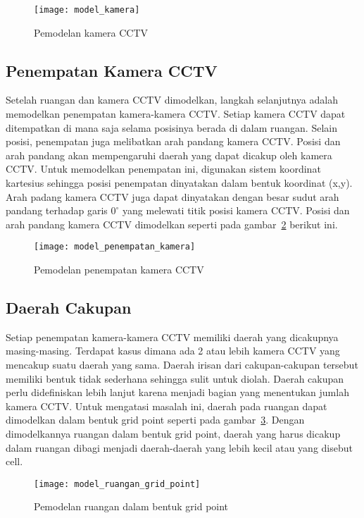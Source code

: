 \begin{figure}[H]
	\centering  
	\texttt{[image: model\_kamera]}
	\caption[Pemodelan kamera CCTV]{Pemodelan kamera CCTV} 
	\label{fig:model_kamera}
\end{figure}

\subsection{Penempatan Kamera CCTV}
Setelah ruangan dan kamera CCTV dimodelkan, langkah selanjutnya adalah memodelkan penempatan kamera-kamera CCTV. Setiap kamera CCTV dapat ditempatkan di mana saja selama posisinya berada di dalam ruangan. Selain posisi, penempatan juga melibatkan arah pandang kamera CCTV. Posisi dan arah pandang akan mempengaruhi daerah yang dapat dicakup oleh kamera CCTV. Untuk memodelkan penempatan ini, digunakan sistem koordinat kartesius sehingga posisi penempatan dinyatakan dalam bentuk koordinat (x,y). Arah padang kamera CCTV juga dapat dinyatakan dengan besar sudut arah pandang terhadap garis \(0^\circ\) yang melewati titik posisi kamera CCTV. Posisi dan arah pandang kamera CCTV dimodelkan seperti pada gambar~\ref{fig:model_penempatan_kamera} berikut ini.

\begin{figure}[H]
	\centering  
	\texttt{[image: model\_penempatan\_kamera]}
	\caption[Pemodelan penempatan kamera CCTV]{Pemodelan penempatan kamera CCTV} 
	\label{fig:model_penempatan_kamera}
\end{figure}

\subsection{Daerah Cakupan}
Setiap penempatan kamera-kamera CCTV memiliki daerah yang dicakupnya masing-masing. Terdapat kasus dimana ada 2 atau lebih kamera CCTV yang mencakup suatu daerah yang sama. Daerah irisan dari cakupan-cakupan tersebut memiliki bentuk tidak sederhana sehingga sulit untuk diolah. Daerah cakupan perlu didefiniskan lebih lanjut karena menjadi bagian yang menentukan jumlah kamera CCTV. Untuk mengatasi masalah ini, daerah pada ruangan dapat dimodelkan dalam bentuk grid point seperti pada gambar~\ref{fig:model_ruangan_grid_point}. Dengan dimodelkannya ruangan dalam bentuk grid point, daerah yang harus dicakup dalam ruangan dibagi menjadi daerah-daerah yang lebih kecil atau yang disebut cell.

\begin{figure}[H]
	\centering  
	\texttt{[image: model\_ruangan\_grid\_point]}
	\caption[Pemodelan ruangan dalam bentuk grid point]{Pemodelan ruangan dalam bentuk grid point} 
	\label{fig:model_ruangan_grid_point}
\end{figure}

